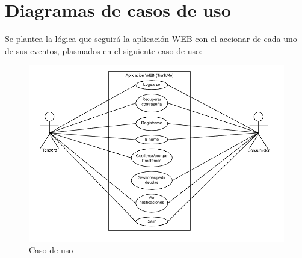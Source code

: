 \section{Diagramas de casos de uso}

{Se plantea la lógica que seguirá la aplicación WEB con el accionar de cada uno de sus eventos, plasmados en el siguiente caso de uso:

\begin{figure}[H]
	\centering
	\includegraphics[width=1\linewidth]{development/casos.png}
	\caption{Caso de uso}
\end{figure}}

